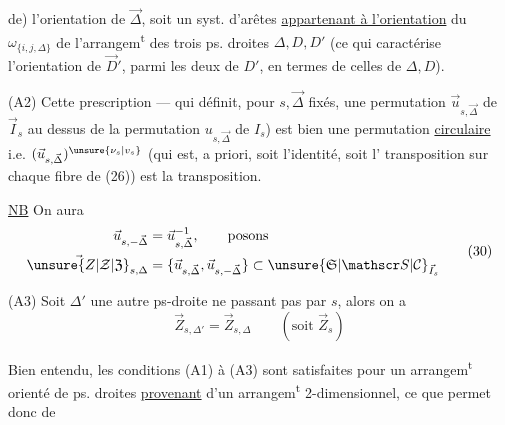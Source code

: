 de) l'orientation de $\vec\Delta$, soit un syst. 
d'arêtes \uline{appartenant à l'orientation} du 
$\omega_{\{i,j,\Delta\}}$ de l'arrangem\textsuperscript{t} des trois ps. droites
$\Delta,D,D'$ (ce qui caractérise l'orientation de
$\vec D'$, parmi les deux de $D'$, en termes de
celles de $\Delta,D$).

(A2) Cette prescription — qui définit,  pour
$s,\vec\Delta$ fixés, une permutation $\vec u_{s,\vec\Delta}$ de $\vec I_s$
au dessus de la permutation $u_{s,\vec\Delta}$ de $I_s$)
est bien une permutation \uline{circulaire}
 i.e. $(\vec u_{s,\vec\Delta})^{\unsure{\nu_s|v_s}}$ (qui est, 
a priori, soit l'identité, soit l' transposition
sur chaque fibre de (26))  est la transposition.

\uline{NB} On aura 
\[\begin{aligned}\vec u_{s,-\vec\Delta}&=\vec u_{s,\vec\Delta}^{-1},\qquad\text{posons}\\
\vec{\unsure{Z|\mathcal Z|\mathfrak Z}}_{s,\Delta}&=\{\vec u_{s,\vec\Delta},\vec u_{s,-\vec\Delta}\}\subset{\unsure{\mathfrak S|\mathscr S|\mathcal C}}_{\vec I_s}
\end{aligned}\tag*{(30)}\]

(A3) Soit $\Delta'$ une autre ps-droite ne passant pas
par $s$, alors on a
\[\vec Z_{s,\Delta'}=\vec Z_{s,\Delta}\qquad(\text{soit }\vec Z_s)\]

Bien entendu, les conditions (A1) à (A3)
sont satisfaites pour un arrangem\textsuperscript{t}  orienté
de ps. droites \uline{provenant} d'un arrangem\textsuperscript{t} 2-dimensionnel,
ce que permet donc de
